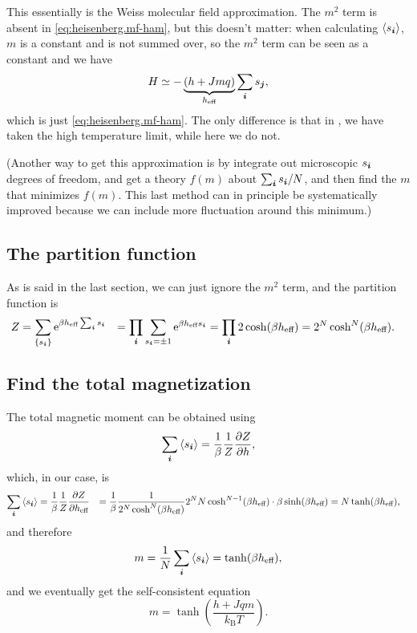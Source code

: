 \documentclass[hyperref, a4paper]{article}
\newcommand*{\ee}{\mathrm{e}}
\def\\{}%
\newcommand*{\kB}{k_{\text{B}}}
\begin{document}
This essentially is the Weiss molecular field approximation.
The $m^2$ term is absent in \eqref{eq:heisenberg.mf-ham}, 
but this doesn't matter: 
when calculating $\expval{s_{\vb*{i}}}$, 
$m$ is a constant and is not summed over, 
so the $m^2$ term can be seen as a constant 
and we have 
\[
    H \simeq - \underbrace{(h + Jmq)}_{h_{\text{eff}}} \sum_{\vb*{i}} s_{\vb*{j}} ,
\]
which is just \eqref{eq:heisenberg.mf-ham}.
The only difference is that in ,
we have taken the high temperature limit, 
while here we do not.

(Another way to get this approximation is 
by integrate out microscopic $s_{\vb*{i}}$ degrees of freedom, 
and get a theory $f(m)$ about $\sum_{\vb*{i}} s_{\vb*{i}} / N$, 
and then find the $m$ that minimizes $f(m)$.
This last method can in principle be systematically improved 
because we can include more fluctuation around this minimum.) 

\subsection{The partition function}

As is said in the last section, 
we can just ignore the $m^2$ term, 
and the partition function is 
\begin{equation}
    \begin{aligned}
        Z &= \sum_{\{s_{\vb*{i}}\}} \ee^{ \beta h_{\text{eff}} \sum_{\vb*{i}} s_{\vb*{i}}} \\
        &= \prod_{\vb*{i}} \sum_{s_{\vb*{i}} = \pm 1} 
        \ee^{\beta h_{\text{eff}} s_{\vb*{i}}} = \prod_{\vb*{i}} 2 \cosh (\beta h_{\text{eff}}) \\
        &= 2^N \cosh^N (\beta h_{\text{eff}}). 
    \end{aligned} 
\end{equation}

\subsection{Find the total magnetization}

The total magnetic moment can be obtained using 
\begin{equation}
    \sum_{\vb*{i}} \expval{s_{\vb*{i}}} = \frac{1}{\beta} \frac{1}{Z} \pdv{Z}{h} , 
\end{equation}
which, in our case, is 
\[
    \begin{aligned}
        \sum_{\vb*{i}} \expval{s_{\vb*{i}}} &= \frac{1}{\beta} \frac{1}{Z} \pdv{Z}{h_{\text{eff}}} \\
        &= \frac{1}{\beta} \frac{1}{2^N \cosh^N (\beta h_{\text{eff}})} 
        2^N N \cosh^{N-1} (\beta h_{\text{eff}}) \cdot \beta \sinh(\beta h_{\text{eff}}) \\
        &= N \tanh (\beta h_{\text{eff}}), 
    \end{aligned}
\]
and therefore 
\[
    m = \frac{1}{N} \sum_{\vb*{i}} \expval{s_{\vb*{i}}}
    = \tanh(\beta h_{\text{eff}}),
\]
and we eventually get the self-consistent equation 
\begin{equation}
    m = \tanh(\frac{h + Jq m}{\kB T}).
    \label{eq:ising.scf}
\end{equation}
\end{document}
